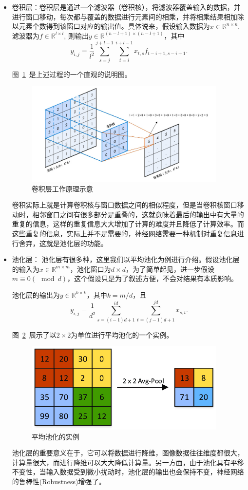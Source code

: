 \begin{itemize}
  \item 卷积层：卷积层是通过一个滤波器（卷积核），将滤波器覆盖输入的数据，并进行窗口移动，每次都与覆盖的数据进行元素间的相乘，并将相乘结果相加除以元素个数得到该窗口对应的输出值。具体说来，假设输入数据为$x\in \mathbb{R}^{n\times n}$, 滤波器为$f\in \mathbb{R}^{l\times l}$, 则输出$y\in \mathbb{R}^{(n-l+1)\times (n-l+1)}$，其中
  \[
    y_{i,j} = \frac{1}{l^2}\sum_{s = j}^{j+l-1}\sum_{t = i}^{i+l-1} x_{t,s}f_{t-i+1,s-i+1}.
  \]
  \par
  图~\ref{fig:conv}~是上述过程的一个直观的说明图。
  \begin{figure}
  \centering
  \includegraphics[width=10cm]{./figures/conv.jpg}
  \caption{卷积层工作原理示意}
  \label{fig:conv}
  \end{figure}
  \par
  卷积实际上就是计算卷积核与窗口数据之间的相似程度，但是当卷积核窗口移动时，相邻窗口之间有很多部分是重叠的，这就意味着最后的输出中有大量的重复的信息，这样的重复信息大大增加了计算的难度并且降低了计算效率。而这些重复的信息，实际上并不是需要的，神经网络需要一种机制对重复信息进行舍弃，这就是池化层的功能。
  \item 池化层：	池化层有很多种，这里我们以平均池化为例进行介绍。假设池化层的输入为$x\in \mathbb{R}^{m\times m}$，池化窗口为$d\times d$，为了简单起见，进一步假设$m\equiv 0 (\mod d)$，这个假设只是为了叙述方便，不会对结果有本质影响。
  \par
  池化层的输出为$y\in \mathbb{R}^{k\times k}$，其中$k = m/d$，且
  \[
  	y_{i,j} = \frac{1}{d^2}\sum_{s=(i-1)d+1}^{id}\sum_{t=(j-1)d+1}^{jd}x_{s,t}.
  \]
  \par
  图~\ref{fig:avgpool}~展示了以$2\times2$为单位进行平均池化的一个实例。
  \begin{figure}
  \centering
  \includegraphics[width=10cm]{./figures/avgpool.png}
  \caption{平均池化的实例}
  \label{fig:avgpool}
  \end{figure}
  \par
  池化层的重要意义在于，它可以将数据进行降维，图像数据往往维度都很大，计算量很大，而进行降维可以大大降低计算量。另一方面，由于池化具有平移不变性，当输入数据受到微小扰动时，池化层的输出也会保持不变，神经网络的鲁棒性(Robustness)增强了。
\end{itemize}

